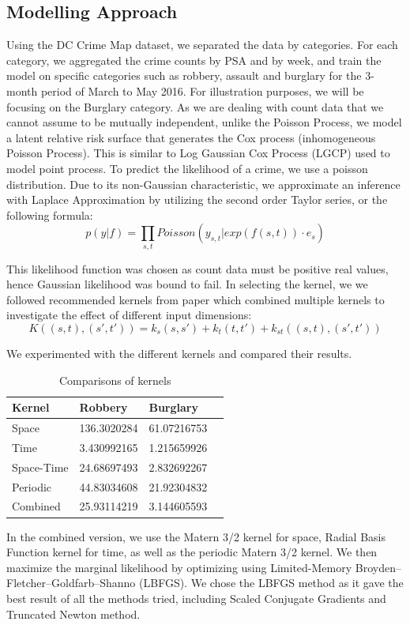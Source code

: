 \documentclass[letterpaper]{article}
\begin{document}
	\subsection{Modelling Approach}
	Using the DC Crime Map dataset, we separated the data by categories. For each category, we aggregated the crime counts by PSA and by week, and train the model on specific categories such as robbery, assault and burglary for the 3-month period of March to May 2016.  For illustration purposes, we will be focusing on the Burglary category.
	As we are dealing with count data that we cannot assume to be mutually independent, unlike the Poisson Process, we model a latent relative risk surface that generates the Cox process (inhomogeneous Poisson Process).
	This is similar to Log Gaussian Cox Process (LGCP) used to model point process.
	To predict the likelihood of a crime, we use a poisson distribution. Due to its non-Gaussian characteristic, we approximate an inference with Laplace Approximation by utilizing the second order Taylor series, or the following formula:
	\[p(y|f) = \prod_{s,t}Poisson(y_{s,t}|exp(f(s,t))\cdot e_s)\]

	This likelihood function was chosen as count data must be positive real values, hence Gaussian likelihood was bound to fail.
	In selecting the kernel, we we followed recommended kernels from paper which combined multiple kernels to investigate the effect of different input dimensions:
	\[K((s,t),(s',t')) = k_s(s,s')+k_t(t,t')+k_{st}((s,t),(s',t'))\]

	We experimented with the different kernels and compared their results.
	\begin{table}[!ht]
		\begin{tabular}{| p{2.5cm} | l | p{2cm} | p{2cm} | }
		\hline
		Kernel & Robbery & Burglary \\ \hline
		Space & 136.3020284 & 61.07216753\\
		Time & 3.430992165 & 1.215659926\\
		Space-Time & 24.68697493 & 2.832692267\\
		Periodic & 44.83034608 & 21.92304832\\
		Combined & 25.93114219 & 3.144605593\\
		\hline
		\end{tabular}
		\caption{Comparisons of kernels}
		\label{t1}
	\end{table}
	In the combined version, we use the Matern 3/2 kernel for space, Radial Basis Function kernel for time, as well as the periodic Matern 3/2 kernel.
	We then maximize the marginal likelihood by optimizing using Limited-Memory Broyden–Fletcher–Goldfarb–Shanno (LBFGS).
	We chose the LBFGS method as it gave the best result of all the methods tried, including Scaled Conjugate Gradients and Truncated Newton method.
	
\end{document}
